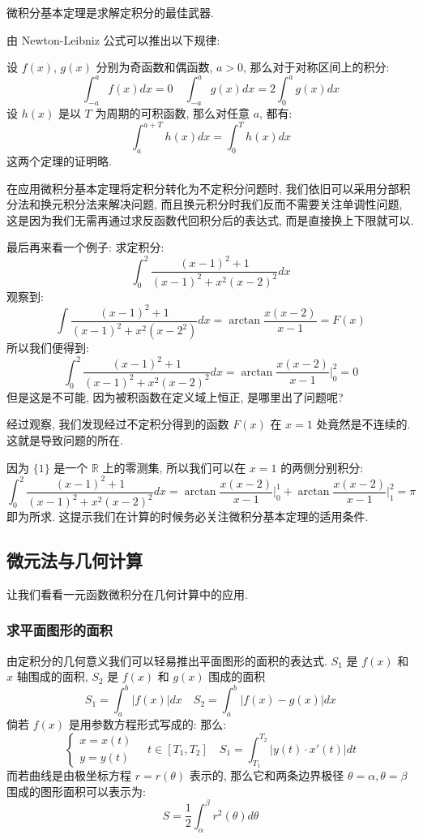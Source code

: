 \documentclass[a4paper,12pt]{ctexart}
\begin{document}
微积分基本定理是求解定积分的最佳武器.

由 Newton-Leibniz 公式可以推出以下规律:

设 $f(x)$, $g(x)$ 分别为奇函数和偶函数, $a>0$, 那么对于对称区间上的积分:
$$
\int_{-a}^a f(x)dx = 0 \quad \int_{-a}^{a}g(x)dx = 2 \int_0^a g(x)dx
$$
设 $h(x)$ 是以 $T$ 为周期的可积函数, 那么对任意 $a$, 都有:
$$
\int_a^{a+T}h(x)dx = \int_0^Th(x)dx
$$
这两个定理的证明略.

在应用微积分基本定理将定积分转化为不定积分问题时, 我们依旧可以采用分部积分法和换元积分法来解决问题, 而且换元积分时我们反而不需要关注单调性问题, 这是因为我们无需再通过求反函数代回积分后的表达式, 而是直接换上下限就可以.

最后再来看一个例子: 求定积分:
$$
\int_0^2\frac{(x-1)^2+1}{(x-1)^2+x^2(x-2)^2}dx
$$
观察到:
$$
\int \frac{(x-1)^2+1}{(x-1)^2+x^2(x-2^2)}dx = \arctan \frac{x(x-2)}{x-1} = F(x)
$$
所以我们便得到:
$$
\int_0^2\frac{(x-1)^2+1}{(x-1)^2+x^2(x-2)^2}dx = \arctan \frac{x(x-2)}{x-1} \bigg|_0^2 = 0
$$
但是这是不可能, 因为被积函数在定义域上恒正, 是哪里出了问题呢?

经过观察, 我们发现经过不定积分得到的函数 $F(x)$ 在 $x=1$ 处竟然是不连续的. 这就是导致问题的所在.

因为 $\{1\}$ 是一个 $\mathbb{R}$ 上的零测集, 所以我们可以在 $x=1$ 的两侧分别积分:
$$
\int_0^2\frac{(x-1)^2+1}{(x-1)^2+x^2(x-2)^2}dx = \arctan \frac{x(x-2)}{x-1} \bigg|_0^1+ \arctan \frac{x(x-2)}{x-1} \bigg|_1^2=\pi
$$
即为所求. 这提示我们在计算的时候务必关注微积分基本定理的适用条件.

\subsection{微元法与几何计算}

让我们看看一元函数微积分在几何计算中的应用.

\subsubsection{求平面图形的面积}
由定积分的几何意义我们可以轻易推出平面图形的面积的表达式.
$S_1$ 是 $f(x)$ 和 $x$ 轴围成的面积, $S_2$ 是 $f(x)$ 和 $g(x)$ 围成的面积
$$
S_1 = \int_a^b |f(x)| dx \quad S_2=\int_a^b|f(x)-g(x)|dx
$$
倘若 $f(x)$ 是用参数方程形式写成的: 那么:
$$
\begin{cases}
    x = x(t) \\
    y = y(t)
\end{cases}
\quad t \in [T_1,T_2]
\quad S_1 = \int_{T_1}^{T_2}|y(t) \cdot x'(t)|dt
$$
而若曲线是由极坐标方程 $r = r(\theta)$ 表示的, 那么它和两条边界极径 $\theta = \alpha, \theta = \beta$ 围成的图形面积可以表示为:
$$
S = \frac{1}{2} \int_{\alpha}^{\beta}r^2(\theta)d\theta
$$
\end{document}
